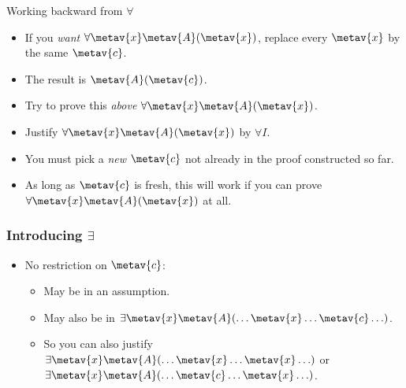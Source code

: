 \begin{frame}{Working backward from $\forall$}

  \begin{itemize}[<+->]
    \item If you \emph{want $\forall \metav{x}\metav{A}(\metav{x})$}, replace every $\metav{x}$ by the
      same $\metav{c}$.
    \item The result is $\metav{A}(\metav{c})$. 
    \item Try to prove this \emph{above} $\forall \metav{x}\metav{A}(\metav{x})$.
    \item Justify $\forall \metav{x}\metav{A}(\metav{x})$ by $\forall I$.
    \item You must pick a \emph{new} $\metav{c}$ not already in the
    proof constructed so far.
    \item As long as $\metav{c}$ is fresh, this will work if you can
    prove $\forall \metav{x}\metav{A}(\metav{x})$ at all.
    \end{itemize}
\end{frame}


\begin{frame}
  \frametitle{Introducing $\exists$}

  \begin{fitchproof}
  \end{fitchproof}
  \begin{itemize}[<+->]
    \item No restriction on $\metav{c}$:
    \begin{itemize}[<+->]
      \item May be in an assumption.
      \item May also be in $\exists \metav{x}\metav{A}(\ldots \metav{x}
      \ldots \metav{c}\ldots)$.
      \item So you can also justify $\exists \metav{x}\metav{A}(\ldots \metav{x}
      \ldots \metav{x}\ldots)$ or $\exists \metav{x}\metav{A}(\ldots \metav{c}
      \ldots \metav{x}\ldots)$.
    \end{itemize}
  \end{itemize}
\end{frame}

